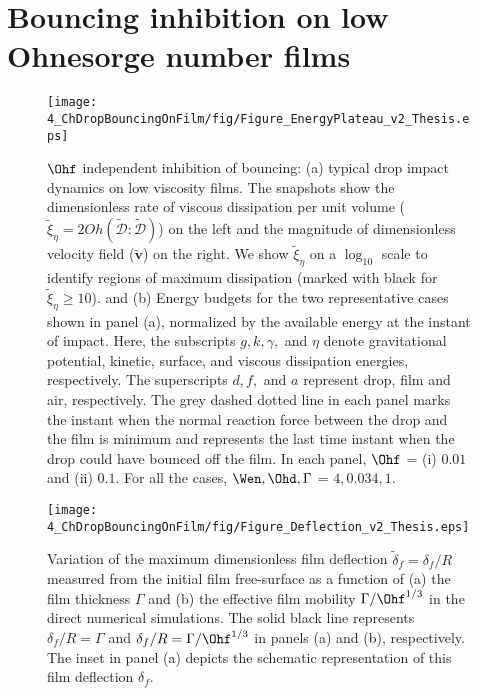 \section{Bouncing inhibition on low Ohnesorge number films}
\label{sec:EnergySection}

\begin{figure}
	\centering
	\texttt{[image: 4\_ChDropBouncingOnFilm/fig/Figure\_EnergyPlateau\_v2\_Thesis.eps]}
	\caption{$\Ohf$ independent inhibition of bouncing: (a) typical drop impact dynamics on low viscosity films. The snapshots show the dimensionless rate of viscous dissipation per unit volume ($\tilde{\xi}_\eta = 2Oh\left(\boldsymbol{\tilde{\mathcal{D}}:\tilde{\mathcal{D}}}\right)$) on the left and the magnitude of dimensionless velocity field ($\boldsymbol{\tilde{v}}$) on the right. We show $\tilde{\xi}_\eta$ on a $\log_{\text{10}}$ scale to identify regions of maximum dissipation (marked with black for $\tilde{\xi}_\eta \ge 10$).  and (b) Energy budgets for the two representative cases shown in panel (a), normalized by the available energy at the instant of impact. Here, the subscripts $g, k, \gamma,$ and $\eta$ denote gravitational potential, kinetic, surface, and viscous dissipation energies, respectively. The superscripts $d, f,$ and $a$ represent drop, film and air, respectively. The grey dashed dotted line in each panel marks the instant when the normal reaction force between the drop and the film is minimum and represents the last time instant when the drop could have bounced off the film. In each panel, $\Ohf$ = (i) $0.01$ and (ii) $0.1$. For all the cases, $\Wen, \Ohd, \Gamma$ = $4, 0.034, 1$. }
	\label{fig:Plateau}
\end{figure}
\begin{figure}
	\centering
	\texttt{[image: 4\_ChDropBouncingOnFilm/fig/Figure\_Deflection\_v2\_Thesis.eps]}
	\caption{Variation of the maximum dimensionless film deflection $\tilde{\delta}_f = \delta_f/R$ measured from the initial film free-surface as a function of (a) the film thickness $\Gamma$ and (b) the effective film mobility $\Gamma / \Ohf^{1/3}$ in the direct numerical simulations. The solid black line represents $\delta_f/R = \Gamma$ and $\delta_f/R = \Gamma/\Ohf^{1/3}$ in panels (a) and (b), respectively. The inset in panel (a) depicts the schematic representation of this film deflection $\delta_f$.}
	\label{fig:Deflection}
\end{figure}

